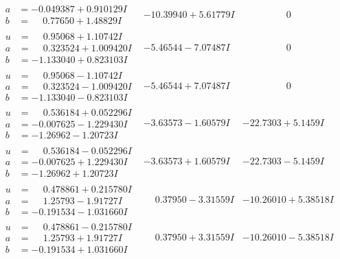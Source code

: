 \documentclass[1p]{elsarticle_modified}
\theoremstyle{definition}
\begin{document}
$$\begin{array}{c|c|c}
\begin{aligned}
a &= -0.049387 + 0.910129 I \\
b &= \phantom{-}0.77650 + 1.48829 I\end{aligned}
 & -10.39940 + 5.61779 I & \phantom{-0.000000 } 0 \\ \hline\begin{aligned}
u &= \phantom{-}0.95068 + 1.10742 I \\
a &= \phantom{-}0.323524 + 1.009420 I \\
b &= -1.133040 + 0.823103 I\end{aligned}
 & -5.46544 - 7.07487 I & \phantom{-0.000000 } 0 \\ \hline\begin{aligned}
u &= \phantom{-}0.95068 - 1.10742 I \\
a &= \phantom{-}0.323524 - 1.009420 I \\
b &= -1.133040 - 0.823103 I\end{aligned}
 & -5.46544 + 7.07487 I & \phantom{-0.000000 } 0 \\ \hline\begin{aligned}
u &= \phantom{-}0.536184 + 0.052296 I \\
a &= -0.007625 - 1.229430 I \\
b &= -1.26962 - 1.20723 I\end{aligned}
 & -3.63573 - 1.60579 I & -22.7303 + 5.1459 I \\ \hline\begin{aligned}
u &= \phantom{-}0.536184 - 0.052296 I \\
a &= -0.007625 + 1.229430 I \\
b &= -1.26962 + 1.20723 I\end{aligned}
 & -3.63573 + 1.60579 I & -22.7303 - 5.1459 I \\ \hline\begin{aligned}
u &= \phantom{-}0.478861 + 0.215780 I \\
a &= \phantom{-}1.25793 - 1.91727 I \\
b &= -0.191534 - 1.031660 I\end{aligned}
 & \phantom{-}0.37950 - 3.31559 I & -10.26010 + 5.38518 I \\ \hline\begin{aligned}
u &= \phantom{-}0.478861 - 0.215780 I \\
a &= \phantom{-}1.25793 + 1.91727 I \\
b &= -0.191534 + 1.031660 I\end{aligned}
 & \phantom{-}0.37950 + 3.31559 I & -10.26010 - 5.38518 I \\ \hline\begin{aligned}

\end{aligned}
\end{array}$$
\end{document}
